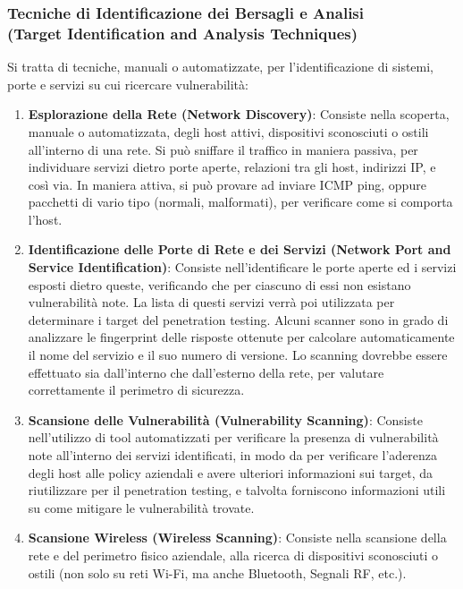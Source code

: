 \documentclass{article}
\begin{document}
\subsubsection{Tecniche di Identificazione dei Bersagli e Analisi \\(Target Identification and Analysis Techniques)}
Si tratta di tecniche, manuali o automatizzate, per l’identificazione di sistemi, porte e servizi su cui ricercare vulnerabilità:
\begin{enumerate}
    \item \textbf{Esplorazione della Rete (Network Discovery)}: Consiste nella scoperta, 
    manuale o automatizzata, degli host attivi, dispositivi sconosciuti o ostili all’interno 
    di una rete. Si può sniffare il traffico in maniera passiva, per individuare servizi 
    dietro porte aperte, relazioni tra gli host, indirizzi IP, e così via. In maniera attiva, 
    si può provare ad inviare ICMP ping, oppure pacchetti di vario tipo (normali, 
    malformati), per verificare come si comporta l’host.
    
    \item \textbf{Identificazione delle Porte di Rete e dei Servizi (Network Port and Service Identification)}: Consiste nell'identificare le porte aperte ed i servizi esposti dietro queste, verificando che per ciascuno di essi non esistano vulnerabilità note. La lista di questi servizi verrà poi utilizzata per determinare i target del penetration testing. Alcuni scanner sono in grado di analizzare le fingerprint delle risposte ottenute per calcolare automaticamente il nome del servizio e il suo numero di versione. Lo scanning dovrebbe essere effettuato sia dall’interno che dall’esterno della rete, per valutare correttamente il perimetro di sicurezza.

    \item \textbf{Scansione delle Vulnerabilità (Vulnerability Scanning)}: Consiste nell'utilizzo di tool automatizzati per verificare la presenza di vulnerabilità note all’interno dei servizi identificati, in modo da per verificare l’aderenza degli host alle policy aziendali e avere ulteriori informazioni sui target, da riutilizzare per il penetration testing, e talvolta forniscono informazioni utili su come mitigare le vulnerabilità trovate.

    \item \textbf{Scansione Wireless (Wireless Scanning)}: Consiste nella scansione della rete e del perimetro fisico aziendale, alla ricerca di dispositivi sconosciuti o ostili (non solo su reti Wi-Fi, ma anche Bluetooth, Segnali RF, etc.).
\end{enumerate}
    
\end{document}
